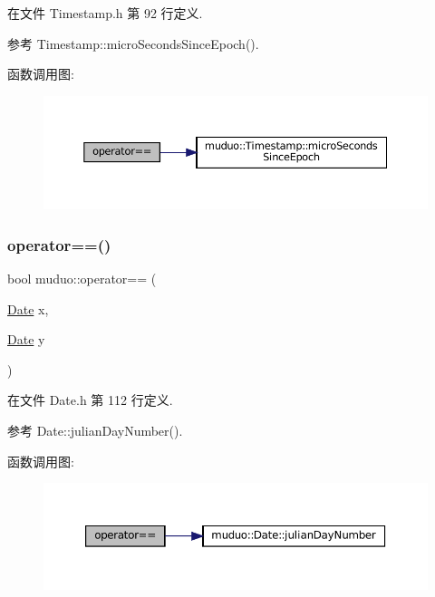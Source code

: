 在文件 Timestamp.\+h 第 92 行定义.



参考 Timestamp\+::micro\+Seconds\+Since\+Epoch().

函数调用图\+:
\nopagebreak
\begin{figure}[H]
\begin{center}
\leavevmode
\includegraphics[width=350pt]{namespacemuduo_abf794c2f7edbea7af7ae48632eef1b84_cgraph}
\end{center}
\end{figure}
\mbox{\label{namespacemuduo_a0a048e90c15864ab82a55b148bebd144}} 
\subsubsection{\texorpdfstring{operator==()}{operator==()}\hspace{0.1cm}{\footnotesize\ttfamily [2/2]}}
{\footnotesize\ttfamily bool muduo\+::operator== (\begin{DoxyParamCaption}\item[{\hyperlink{classmuduo_1_1Date}{Date}}]{x,  }\item[{\hyperlink{classmuduo_1_1Date}{Date}}]{y }\end{DoxyParamCaption})\hspace{0.3cm}{\ttfamily [inline]}}



在文件 Date.\+h 第 112 行定义.



参考 Date\+::julian\+Day\+Number().

函数调用图\+:
\nopagebreak
\begin{figure}[H]
\begin{center}
\leavevmode
\includegraphics[width=350pt]{namespacemuduo_a0a048e90c15864ab82a55b148bebd144_cgraph}
\end{center}
\end{figure}
\mbox{\label{namespacemuduo_a8c7278edf83f347bacf79e36689bf91c}} 
